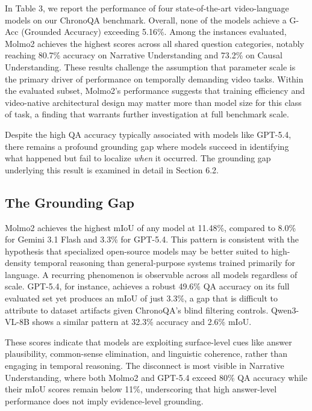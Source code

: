 \documentclass[sigconf,natbib=false,nonacm]{acmart}
\begin{document}
In Table 3, we report the performance of four state-of-the-art video-language models on our ChronoQA benchmark. Overall, none of the models achieve a G-Acc (Grounded Accuracy) exceeding 5.16\%. Among the instances evaluated, Molmo2 achieves the highest scores across all shared question categories, notably reaching 80.7\% accuracy on Narrative Understanding and 73.2\% on Causal Understanding. These results challenge the assumption that parameter scale is the primary driver of performance on temporally demanding video tasks. Within the evaluated subset, Molmo2's performance suggests that training efficiency and video-native architectural design may matter more than model size for this class of task, a finding that warrants further investigation at full benchmark scale.

Despite the high QA accuracy typically associated with models like GPT-5.4, there remains a profound grounding gap where models succeed in identifying what happened but fail to localize \textit{when} it occurred. The grounding gap underlying this result is examined in detail in Section 6.2.


\subsection{The Grounding Gap}

Molmo2 achieves the highest mIoU of any model at 11.48\%, compared to 8.0\% for Gemini 3.1 Flash and 3.3\% for GPT-5.4. This pattern is consistent with the hypothesis that specialized open-source models may be better suited to high-density temporal reasoning than general-purpose systems trained primarily for language. A recurring phenomenon is observable across all models regardless of scale. GPT-5.4, for instance, achieves a robust 49.6\% QA accuracy on its full evaluated set yet produces an mIoU of just 3.3\%, a gap that is difficult to attribute to dataset artifacts given ChronoQA's blind filtering controls. Qwen3-VL-8B shows a similar pattern at 32.3\% accuracy and 2.6\% mIoU. 

These scores indicate that models are exploiting surface-level cues like answer plausibility, common-sense elimination, and linguistic coherence, rather than engaging in temporal reasoning. The disconnect is most visible in Narrative Understanding, where both Molmo2 and GPT-5.4 exceed 80\% QA accuracy while their mIoU scores remain below 11\%, underscoring that high answer-level performance does not imply evidence-level grounding.
\end{document}
